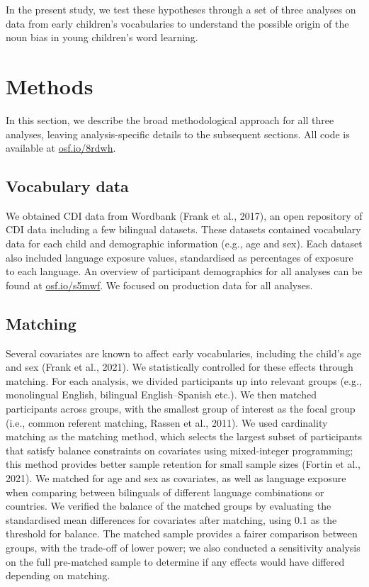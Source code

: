 \documentclass[10pt, letterpaper]{article}
\begin{document}
In the present study, we test these hypotheses through a set of three
analyses on data from early children's vocabularies to understand the
possible origin of the noun bias in young children's word learning.

\section{Methods}\label{methods}

In this section, we describe the broad methodological approach for all
three analyses, leaving analysis-specific details to the subsequent
sections. All code is available at
\href{https://osf.io/8rdwh/?view_only=a6e76ebe23b6422d8e1f90c1093da9db}{osf.io/8rdwh}.

\subsection{Vocabulary data}\label{vocabulary-data}

We obtained CDI data from Wordbank (Frank et al., 2017), an open
repository of CDI data including a few bilingual datasets. These
datasets contained vocabulary data for each child and demographic
information (e.g., age and sex). Each dataset also included language
exposure values, standardised as percentages of exposure to each
language. An overview of participant demographics for all analyses can
be found at
\href{https://osf.io/s5mwf?view_only=a6e76ebe23b6422d8e1f90c1093da9db}{osf.io/s5mwf}.
We focused on production data for all analyses.

\subsection{Matching}\label{matching}

Several covariates are known to affect early vocabularies, including the
child's age and sex (Frank et al., 2021). We statistically controlled
for these effects through matching. For each analysis, we divided
participants up into relevant groups (e.g., monolingual English,
bilingual English--Spanish etc.). We then matched participants across
groups, with the smallest group of interest as the focal group (i.e.,
common referent matching, Rassen et al., 2011). We used cardinality
matching as the matching method, which selects the largest subset of
participants that satisfy balance constraints on covariates using
mixed-integer programming; this method provides better sample retention
for small sample sizes (Fortin et al., 2021). We matched for age and sex
as covariates, as well as language exposure when comparing between
bilinguals of different language combinations or countries. We verified
the balance of the matched groups by evaluating the standardised mean
differences for covariates after matching, using 0.1 as the threshold
for balance. The matched sample provides a fairer comparison between
groups, with the trade-off of lower power; we also conducted a
sensitivity analysis on the full pre-matched sample to determine if any
effects would have differed depending on matching.
\end{document}
